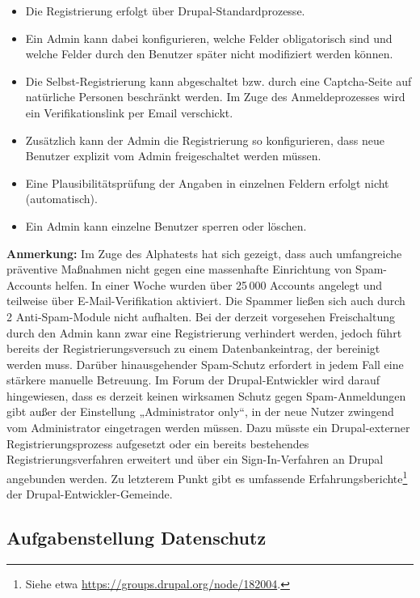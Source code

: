\documentclass[11pt,a4paper,twoside]{article}
\begin{document}
\begin{itemize}\itemsep0pt
\item Die Registrierung erfolgt über Drupal-Standardprozesse. 
\item Ein Admin kann dabei konfigurieren, welche Felder obligatorisch sind und
  welche Felder durch den Benutzer später nicht modifiziert werden können. 
\item Die Selbst-Registrierung kann abgeschaltet bzw. durch eine Captcha-Seite
  auf natürliche Personen beschränkt werden.  Im Zuge des Anmeldeprozesses wird
  ein Verifikationslink per Email verschickt.
\item Zusätzlich kann der Admin die Registrierung so konfigurieren, dass neue
  Benutzer explizit vom Admin freigeschaltet werden müssen. 
\item Eine Plausibilitätsprüfung der Angaben in einzelnen Feldern erfolgt
  nicht (automatisch). 
\item Ein Admin kann einzelne Benutzer sperren oder löschen. 
\end{itemize}

\textbf{Anmerkung:} Im Zuge des Alphatests hat sich gezeigt, dass auch
umfangreiche präventive Maßnahmen nicht gegen eine massenhafte Einrichtung von
Spam-Accounts helfen.  In einer Woche wurden über 25\,000 Accounts angelegt
und teilweise über E-Mail-Verifikation aktiviert. Die Spammer ließen sich auch
durch 2 Anti-Spam-Module nicht aufhalten.  Bei der derzeit vorgesehen
Freischaltung durch den Admin kann zwar eine Registrierung verhindert werden,
jedoch führt bereits der Registrierungsversuch zu einem Datenbankeintrag, der
bereinigt werden muss. Darüber hinausgehender Spam-Schutz erfordert in jedem
Fall eine stärkere manuelle Betreuung.  Im Forum der Drupal-Entwickler wird
darauf hingewiesen, dass es derzeit keinen wirksamen Schutz gegen
Spam-Anmeldungen gibt außer der Einstellung „Administrator only“, in der neue
Nutzer zwingend vom Administrator eingetragen werden müssen. Dazu müsste ein
Drupal-externer Registrierungsprozess aufgesetzt oder ein bereits bestehendes
Registrierungsverfahren erweitert und über ein Sign-In-Verfahren an Drupal
angebunden werden.  Zu letzterem Punkt gibt es umfassende
Erfahrungsberichte\footnote{Siehe etwa
  \url{https://groups.drupal.org/node/182004}.} der
Drupal-Entwickler-Gemeinde.

\subsection*{Aufgabenstellung Datenschutz}
\end{document}
